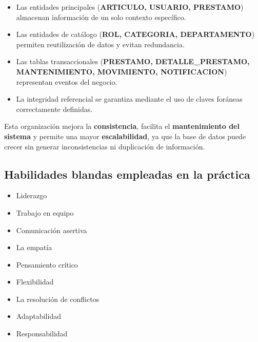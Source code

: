 \documentclass{article}
\begin{document}
\begin{itemize}
    \item Las entidades principales (\textbf{ARTICULO, USUARIO, PRESTAMO}) almacenan información de un solo contexto específico.
    \item Las entidades de catálogo (\textbf{ROL, CATEGORIA, DEPARTAMENTO}) permiten reutilización de datos y evitan redundancia.
    \item Las tablas transaccionales (\textbf{PRESTAMO, DETALLE\_PRESTAMO, MANTENIMIENTO, MOVIMIENTO, NOTIFICACION}) representan eventos del negocio.
    \item La integridad referencial se garantiza mediante el uso de claves foráneas correctamente definidas.
\end{itemize}

Esta organización mejora la \textbf{consistencia}, facilita el \textbf{mantenimiento del sistema} y permite una mayor \textbf{escalabilidad}, ya que la base de datos puede crecer sin generar inconsistencias ni duplicación de información.

\subsection{Habilidades blandas empleadas en la práctica}

\begin{itemize}
    \item[$\square$] Liderazgo
    \item[$\square$] Trabajo en equipo
    \item[$\square$] Comunicación asertiva
    \item[$\square$] La empatía
    \item[$\square$] Pensamiento crítico
    \item[$\square$] Flexibilidad
    \item[$\square$] La resolución de conflictos
    \item[$\square$] Adaptabilidad
    \item[$\square$] Responsabilidad
\end{itemize}
\end{document}
